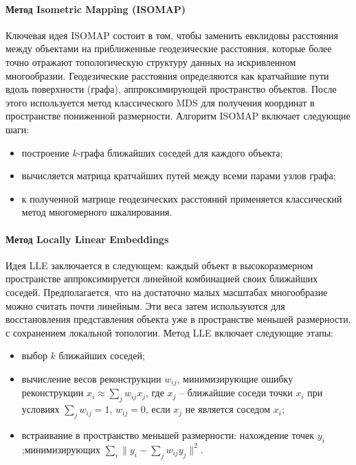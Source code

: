         \paragraph{Метод Isometric Mapping (ISOMAP)}
            Ключевая идея ISOMAP состоит в том, чтобы заменить евклидовы расстояния между объектами на приближенные геодезические расстояния, которые более точно отражают топологическую структуру данных на искривленном многообразии. Геодезические расстояния определяются как кратчайшие пути вдоль поверхности (графа), аппроксимирующей пространство объектов. После этого используется метод классического MDS для получения координат в пространстве пониженной размерности.
            Алгоритм ISOMAP включает следующие шаги:
            \begin{itemize}
                \item построение \(k\)-графа ближайших соседей для каждого объекта;
                \item вычисляется матрица кратчайших путей между всеми парами узлов графа;
                \item к полученной матрице геодезических расстояний применяется классический метод многомерного шкалирования.
            \end{itemize}

        \paragraph{Метод Locally Linear Embeddings}
            Идея LLE заключается в следующем: каждый объект в высокоразмерном пространстве аппроксимируется линейной комбинацией своих ближайших соседей. Предполагается, что на достаточно малых масштабах многообразие можно считать почти линейным. Эти веса затем используются для восстановления представления объекта уже в пространстве меньшей размерности, с сохранением локальной топологии.
            Метод LLE включает следующие этапы:
            \begin{itemize}
                \item выбор \(k\) ближайших соседей;
                \item вычисление весов реконструкции \(w_{ij}\), минимизирующие ошибку реконструкции \(x_i \approx \sum_j w_{ij} x_j\), где \(x_j\) -- ближайшие соседи точки \(x_i\) при условиях \(\sum_j w_{ij} = 1\), \(w_{ij} = 0\), если \(x_j\) не является соседом \(x_i\);
                \item встраивание в пространство меньшей размерности: нахождение точек \(y_i\);минимизирующих \(\sum_i \|y_i - \sum_j w_{ij} y_j\|^2\).
            \end{itemize}

